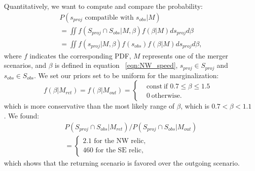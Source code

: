 \documentclass[letterpaper,useAMS,usenatbib]{mn2e}
\begin{document}
Quantitatively, we want to compute and compare the probability:  
\begin{align} 
	&P(s_{proj} \text{ compatible with }s_{obs} | M)  \label{eqn:prob}\\
	&=\iint f(S_{proj} \cap S_{obs} | M, \beta) f(\beta | M) d s_{proj} d\beta\\
	&=\iint  f(s_{proj}|M, \beta) f(s_{obs}) f(\beta | M) d s_{proj}
	d\beta, 
\end{align}
where $f$ indicates the corresponding PDF, $M$
represents one of the merger scenarios, and $\beta$ is defined in equation
~\ref{eqn:NW_speed}, $s_{proj} \in S_{proj}$ and $s_{obs} \in S_{obs}$. 
We set our priors set to be uniform for the marginalization: 
\begin{equation}
	f(\beta | M_{ret}) = f(\beta | M_{out}) =  
	\begin{cases}
		& \text{const}~\text{if } 0.7 \leq \beta \leq 1.5 \\
		& 0~\text{otherwise}.
	\end{cases}
\end{equation}
which is more conservative than the most likely range of $\beta$, which is
$0.7 < \beta < 1.1$.
We found: 
\begin{align}
	&P(S_{proj} \cap S_{obs} | M_{ret}) / P(S_{proj} \cap S_{obs} |
	M_{out})\\
	&=
 \begin{cases}
  2.1 \text{ for the NW relic},\\
  460 \text{ for the SE relic},
 \end{cases}
\end{align}
which shows that the returning scenario is favored over the outgoing
scenario. 
\end{document}
